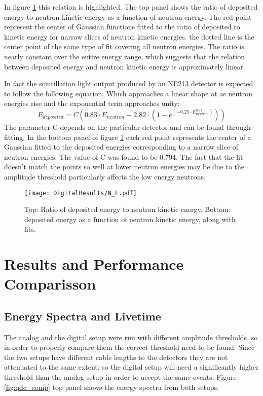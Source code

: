 \documentclass[main.tex]{subfiles}
\begin{document}
In figure \ref{fig:N_E} this relation is highlighted. The top panel shows the ratio of deposited energy to neutron kinetic energy as a function of neutron energy. The red point represent the center of Gaussian functions fitted to the ratio of deposited to kinetic energy for narrow slices of neutron kinetic energies. the dotted line is the center point of the same type of fit covering all neutron energies. The ratio is nearly constant over the entire energy range, which suggests that the relation between deposited energy and neutron kinetic energy is approximately linear.

In fact the scintillation light output produced by an NE213 detector is expected to follow the following equation\cite{Scherzinger:2016}, Which approaches a linear shape at as neutron energies rise and the exponential term approaches unity:
\begin{equation}
	E_{deposited} = C\left(  0.83\cdot E_{neutron} - 2.82\cdot\left(  1 - e^{(-0.25\cdot E_{neutron}^{0.93})}  \right)  \right)
\end{equation}
The parameter C depends on the particular detector and can be found through fitting. In the bottom panel of figure \ref{fig:N_E} each red point represents the center of a Gaussian fitted to the deposited energies corresponding to a narrow slice of neutron energies. The value of C was found to be 0.794. The fact that the fit doesn't match the points so well at lower neutron energies may be due to the amplitude threshold particularly affects the low energy neutrons.

\begin{figure}[ht]
    \centering
        \texttt{[image: DigitalResults/N\_E.pdf]}
        \caption[Neutron kinetic energy and deposited energy.]{Top: Ratio of deposited energy to neutron kinetic energy. Bottom: deposited energy as a function of neutron kinetic energy, along with fits.}
    \label{fig:N_E} 
\end{figure}

\section{Results and Performance Comparisson}\label{sec:comp}
\subsection{Energy Spectra and Livetime}
The analog and the digital setup were run with different amplitude thresholds, so in order to properly compare them the correct threshold need to be found. Since the two setups have different cable lengths to the detectors they are not attenuated to the same extent, so the digital setup will need a significantly higher threshold than the analog setup in order to accept the same events. Figure \ref{fig:qdc_comp} top panel shows the energy spectra from both setups.
\end{document}
